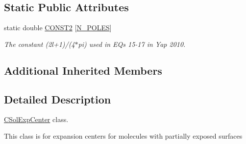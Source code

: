 \subsection*{Static Public Attributes}
\begin{DoxyCompactItemize}
\item 
static double \hyperlink{classCSolExpCenter_a59aa47d85373866df57f052da0dc0ba1}{C\-O\-N\-S\-T2} \mbox{[}\hyperlink{expansion_8h_ac23f9c13c5d07d9ce386f7a830c35e5a}{N\-\_\-\-P\-O\-L\-E\-S}\mbox{]}
\begin{DoxyCompactList}\small\item\em The constant (2l+1)/(4$\ast$pi) used in E\-Qs 15-\/17 in Yap 2010. \end{DoxyCompactList}\end{DoxyCompactItemize}
\subsection*{Additional Inherited Members}


\subsection{Detailed Description}
\hyperlink{classCSolExpCenter}{C\-Sol\-Exp\-Center} class. 

This class is for expansion centers for molecules with partially exposed surfaces 

